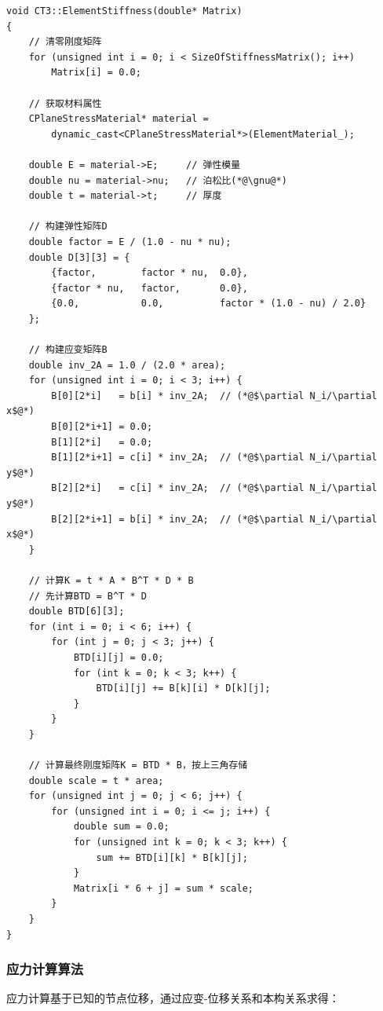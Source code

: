 \documentclass[12pt,a4paper]{article}
\begin{document}
\begin{lstlisting}[caption=单元刚度矩阵计算实现]
void CT3::ElementStiffness(double* Matrix)
{
    // 清零刚度矩阵
    for (unsigned int i = 0; i < SizeOfStiffnessMatrix(); i++)
        Matrix[i] = 0.0;
    
    // 获取材料属性
    CPlaneStressMaterial* material = 
        dynamic_cast<CPlaneStressMaterial*>(ElementMaterial_);
    
    double E = material->E;     // 弹性模量
    double nu = material->nu;   // 泊松比(*@\gnu@*)
    double t = material->t;     // 厚度
    
    // 构建弹性矩阵D
    double factor = E / (1.0 - nu * nu);
    double D[3][3] = {
        {factor,        factor * nu,  0.0},
        {factor * nu,   factor,       0.0},
        {0.0,           0.0,          factor * (1.0 - nu) / 2.0}
    };
    
    // 构建应变矩阵B
    double inv_2A = 1.0 / (2.0 * area);
    for (unsigned int i = 0; i < 3; i++) {
        B[0][2*i]   = b[i] * inv_2A;  // (*@$\partial N_i/\partial x$@*)
        B[0][2*i+1] = 0.0;
        B[1][2*i]   = 0.0;
        B[1][2*i+1] = c[i] * inv_2A;  // (*@$\partial N_i/\partial y$@*)
        B[2][2*i]   = c[i] * inv_2A;  // (*@$\partial N_i/\partial y$@*)
        B[2][2*i+1] = b[i] * inv_2A;  // (*@$\partial N_i/\partial x$@*)
    }
    
    // 计算K = t * A * B^T * D * B
    // 先计算BTD = B^T * D
    double BTD[6][3];
    for (int i = 0; i < 6; i++) {
        for (int j = 0; j < 3; j++) {
            BTD[i][j] = 0.0;
            for (int k = 0; k < 3; k++) {
                BTD[i][j] += B[k][i] * D[k][j];
            }
        }
    }
    
    // 计算最终刚度矩阵K = BTD * B，按上三角存储
    double scale = t * area;
    for (unsigned int j = 0; j < 6; j++) {
        for (unsigned int i = 0; i <= j; i++) {
            double sum = 0.0;
            for (unsigned int k = 0; k < 3; k++) {
                sum += BTD[i][k] * B[k][j];
            }
            Matrix[i * 6 + j] = sum * scale;
        }
    }
}
\end{lstlisting}

\subsubsection{应力计算算法}

应力计算基于已知的节点位移，通过应变-位移关系和本构关系求得：
\end{document}
